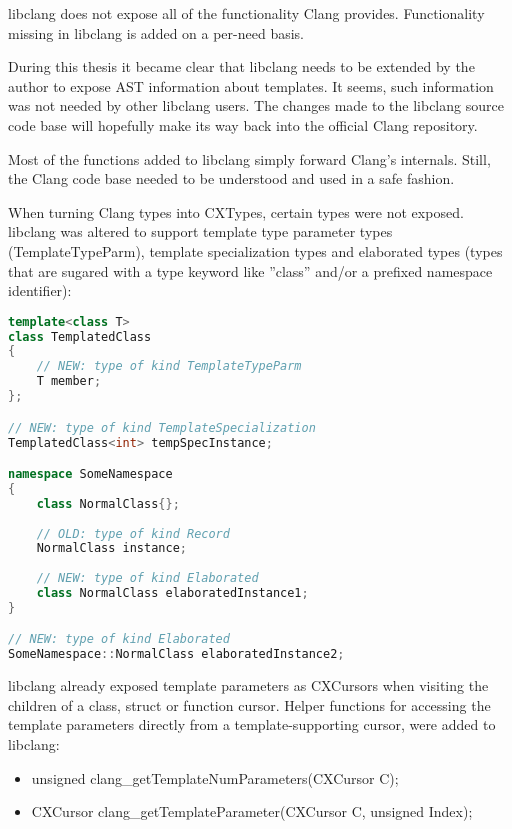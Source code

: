 libclang does not expose all of the functionality Clang provides. Functionality missing in libclang is added on a per-need basis. 

During this thesis it became clear that libclang needs to be extended by the author to expose AST information about templates. It seems, such information was not needed by other libclang users. The changes made to the libclang source code base will hopefully make its way back into the official Clang repository.

Most of the functions added to libclang simply forward Clang's internals. Still, the Clang code base needed to be understood and used in a safe fashion.

When turning Clang types into CXTypes, certain types were not exposed. libclang was altered to support template type parameter types (TemplateTypeParm), template specialization types and elaborated types (types that are sugared with a type keyword like ''class'' and/or a prefixed namespace identifier):

\begin{lstlisting}[language=C++, caption=Examples of types now supported by libclang]
template<class T>
class TemplatedClass
{
	// NEW: type of kind TemplateTypeParm
	T member; 
};

// NEW: type of kind TemplateSpecialization
TemplatedClass<int> tempSpecInstance; 

namespace SomeNamespace
{	
	class NormalClass{};
	
	// OLD: type of kind Record
	NormalClass instance;
	
	// NEW: type of kind Elaborated
	class NormalClass elaboratedInstance1;
}

// NEW: type of kind Elaborated
SomeNamespace::NormalClass elaboratedInstance2; 
\end{lstlisting}


libclang already exposed template parameters as CXCursors when visiting the children of a class, struct or function cursor. Helper functions for accessing the template parameters directly from a template-supporting cursor, were added to libclang:

\begin{itemize}\addtolength{\itemsep}{-0.5\baselineskip}
\item unsigned clang\_getTemplateNumParameters(CXCursor C);
\item CXCursor clang\_getTemplateParameter(CXCursor C, unsigned Index);
\end{itemize}

